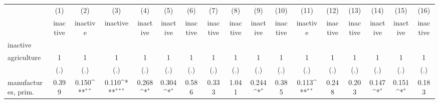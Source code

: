 {
\def\sym#1{\ifmmode^{#1}\else\(^{#1}\)\fi}
\begin{tabular}{l*{16}{c}}
\hline\hline
                    &\multicolumn{1}{c}{(1)}&\multicolumn{1}{c}{(2)}&\multicolumn{1}{c}{(3)}&\multicolumn{1}{c}{(4)}&\multicolumn{1}{c}{(5)}&\multicolumn{1}{c}{(6)}&\multicolumn{1}{c}{(7)}&\multicolumn{1}{c}{(8)}&\multicolumn{1}{c}{(9)}&\multicolumn{1}{c}{(10)}&\multicolumn{1}{c}{(11)}&\multicolumn{1}{c}{(12)}&\multicolumn{1}{c}{(13)}&\multicolumn{1}{c}{(14)}&\multicolumn{1}{c}{(15)}&\multicolumn{1}{c}{(16)}\\
                    &\multicolumn{1}{c}{inactive}&\multicolumn{1}{c}{inactive}&\multicolumn{1}{c}{inactive}&\multicolumn{1}{c}{inactive}&\multicolumn{1}{c}{inactive}&\multicolumn{1}{c}{inactive}&\multicolumn{1}{c}{inactive}&\multicolumn{1}{c}{inactive}&\multicolumn{1}{c}{inactive}&\multicolumn{1}{c}{inactive}&\multicolumn{1}{c}{inactive}&\multicolumn{1}{c}{inactive}&\multicolumn{1}{c}{inactive}&\multicolumn{1}{c}{inactive}&\multicolumn{1}{c}{inactive}&\multicolumn{1}{c}{inactive}\\
\hline
inactive            &                     &                     &                     &                     &                     &                     &                     &                     &                     &                     &                     &                     &                     &                     &                     &                     \\
agriculture         &           1         &           1         &           1         &           1         &           1         &           1         &           1         &           1         &           1         &           1         &           1         &           1         &           1         &           1         &           1         &           1         \\
                    &         (.)         &         (.)         &         (.)         &         (.)         &         (.)         &         (.)         &         (.)         &         (.)         &         (.)         &         (.)         &         (.)         &         (.)         &         (.)         &         (.)         &         (.)         &         (.)         \\
[1em]
manufactures, prim. &       0.399         &       0.150\sym{**} &       0.110\sym{***}&       0.268\sym{*}  &       0.304\sym{*}  &       0.586         &       0.333         &       1.041         &       0.244\sym{*}  &       0.385         &       0.113\sym{**} &       0.248         &       0.203         &       0.147\sym{*}  &       0.151\sym{*}  &       0.183         \\

\end{tabular}}
